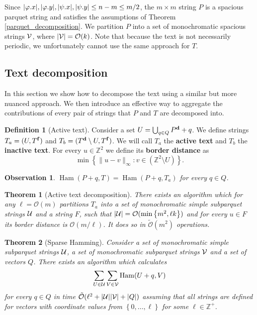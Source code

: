 \documentclass[11pt]{article}
\newcommand{\Z}{\mathbb{Z}}
\renewcommand{\O}{\mathcal{O}}
\newcommand{\tO}{\tilde{\mathcal{O}}}
\renewcommand{\phi}{\varphi}
\newcommand{\set}[1]{\left\lbrace #1 \right\rbrace}
\DeclareMathOperator*{\Ham}{Ham}
\theoremstyle{plain}
\newtheorem{theorem}{Theorem}
\newtheorem{observation}{Observation}
\theoremstyle{definition}
\newtheorem{definition}{Definition}
\theoremstyle{remark}
\begin{document}
Since $|\x{\phi}|, |\y{\phi}|, |\x{\psi}|, |\y{\psi}| \le n - m \le m / 2$, the $m \times m$ string $P$ is a spacious parquet string and satisfies the assumptions of Theorem \ref{parquet_decomposition}.
We partition $P$ into a set of monochromatic spacious strings $\mathcal{V}$, where $|\V| = \O(k)$.
Note that because the text is not necessarily periodic, we unfortunately cannot use the same approach for $T$.


\subsection{Text decomposition}
In this section we show how to decompose the text using a similar but more nuanced approach.
We then introduce an effective way to aggregate the contributions of every pair of strings that $P$ and $T$ are decomposed into.


\newcommand{\Ta}{T_a}
\newcommand{\Tb}{T_b}
\begin{definition}[Active text]
	Consider a set $U = \bigcup_{q \in Q} P^\mathbf{d} + q$. 
	We define strings $\Ta = (U, \f{T})$ and $\Tb = (\d{T} \setminus U, \f{T})$.
	We will call $\Ta$ the \textbf{active text} and $\Tb$ the \textbf{inactive text}.
	For every $u \in \Z^2$ we define its \textbf{border distance} as
	$$\min\set{\|u - v\|_\infty : v \in (\Z^2 \setminus U)}.$$
\end{definition}


\begin{observation}
	$\Ham(P + q, T) = \Ham(P + q, \Ta)$ for every $q \in Q$.
\end{observation}


\begin{theorem}[Active text decomposition]\label{text_decomposition}
	There exists an algorithm which for any $\ell = \O(m)$ partitions $\Ta$ into a set of monochromatic simple subparquet strings $\mathcal{U}$ and a string $F$,
	such that $|\U| = \O(\min\set{m^2, \ell k})$ and for every $u \in F$ its border distance is $\O(m / \ell)$.
	It does so in $\tO(m^2)$ operations.
\end{theorem}


\begin{theorem}[Sparse Hamming]\label{sparse_algo}
	Consider a set of monochromatic simple subparquet strings $\mathcal{U}$, a set of monochromatic subparquet strings $\mathcal{V}$ and a set of vectors $Q$.
	There exists an algorithm which calculates
	$$ \sum_{U \in \U}\sum_{V \in \V} \Ham(U + q, V) $$
	for every $q \in Q$ in time $\tO(\ell^2 + |\U||\V| + |Q|)$ assuming that all strings are defined for vectors with coordinate values from $\set{0, \dots, \ell}$ for some $\ell \in \Z^+$.
\end{theorem}
\end{document}
